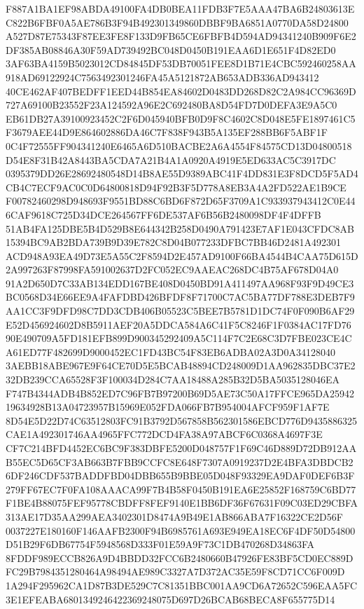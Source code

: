 \documentclass[UTF8,fontset=fandol,zihao=-4,a4paper]{ctexart}
\begin{document}
{{F887A1BA1EF98ABDA49100FA4DB0BEA11FDB3F7E5AAA47BA6B24803613EC822B6FBF0A5AE786B3F94B492301349860DBBF9BA6851A0770DA58D24800
A527D87E75343F87EE3FE8F133D9FB65CE6FBFB4D594AD94341240B909F6E2DF385AB08846A30F59AD739492BC048D0450B191EAA6D1E651F4D82ED0
3AF63BA4159B5023012CD84845DF53DB70051FEE8D1B71E4CBC592460258AA918AD69122924C7563492301246FA45A5121872AB653ADB336AD943412
40CE462AF407BEDFF1EED44B854EA84602D0483DD268D82C2A984CC96369D727A69100B23552F23A124592A96E2C692480BA8D54FD7D0DEFA3E9A5C0
EB61DB27A39100923452C2F6D045940BFB0D9F8C4602C8D048E5FE1897461C5F3679AEE44D9E864602886DA46C7F838F943B5A135EF288BB6F5ABF1F
0C4F72555FF904341240E6465A6D510BACBE2A6A4554F84575CD13D04800518D54E8F31B42A8443BA5CDA7A21B4A1A0920A4919E5ED633AC5C3917DC
0395379DD26E28692480548D14B8AE55D9389ABC41F4DD831E3F8DCD5F5AD4CB4C7ECF9AC0C0D64800818D94F92B3F5D778A8EB3A4A2FD522AE1B9CE
F00782460298D948693F9551BD88C6BD6F872D65F3709A1C933937943412C0E446CAF9618C725D34DCE264567FF6DE537AF6B56B2480098DF4F4DFFB
51AB4FA125DBE5B4D529B8E644342B258D0490A791423E7AF1E043CFDC8AB15394BC9AB2BDA739B9D39E782C8D04B077233DFBC7BB46D2481A492301
ACD948A93EA49D73E5A55C2F8594D2E457AD9100F66BA4544B4CAA75D615D2A997263F87998FA591002637D2FC052EC9AAEAC268DC4B75AF678D04A0
91A2D650D7C33AB134EDD167BE408D0450BD91A411497AA968F93F9D49CE3BC0568D34E66EE9A4FAFDBD426BFDF8F71700C7AC5BA77DF788E3DEB7F9
AA1CC3F9DFD98C7DD3CDB406B05523C5BEE7B5781D1DC74F0F090B6AF29E52D456924602D8B5911AEF20A5DDCA584A6C41F5C8246F1F0384AC17FD76
90E490709A5FD181EFB899D900345292409A5C114F7C2E68C3D7FBE023CE4CA61ED77F482699D9000452EC1FD43BC54F83EB6ADBA02A3D0A34128040
3AEBB18ABE967E9F64CE70D5E5BCAB48894CD248009D1AA962835DBC37E232DB239CCA65528F3F100034D284C7AA18488A285B32D5BA5035128046EA
F747B4344ADB4B852ED7C96FB7B97200B69D5AE73C50A17FFCE965DA2594219634928B13A04723957B15969E052FDA066FB7B954004AFCF959F1AF7E
8D54E5D22D74C63512803FC91B3792D567858B562301586EBCD776D9435886325CAE1A492301746AA4965FFC772DCD4FA38A97ABCF6C0368A4697F3E
CF7C214BFD4452EC6BC9F383DBFE5200D048757F1F69C46D889D72DB912AAB55EC5D65CF3AB663B7FBB9CCFC8E648F7307A0919237D2E4BFA3DBDCB2
6DF246CDF537BADDFBD04DBB655B9BBE05D048F93329EA9DAF0DEF6B3F279FF67EC7F0FA108AAACA99F7B4B58F0450B191EA6E25852F168759C6BD77
F1BE4B88075FEF95778CBDFF8FEF9140E1BB6DF36F67631F09C03ED29CBFA313AE17D35AA299AEA3402301D8474A9B49E1AB866ABA7F16322CE2D56F
0037227E180160F146AAFB2300F94B6985761A693E949EA18EC6F4DF50D54800D51B29F6DB67754F5948568D333F01E59A9F73C1DB470268D34863FA
8FDDF989ECCB826A9D4BBDD32FCC6B2480660B47926FE83BF5CD0EC889DFC29B7984351280464A98494AE989C3327A7D372AC35E59F8CD71CC6F009D
1A294F295962CA1D87B3DE529C7C81351BBC001AA9CD6A72652C596EAA5FC3E1EFEABA6801349246422369248075D697D26BCAB68BECA8F655775D14
}}
\end{document}
